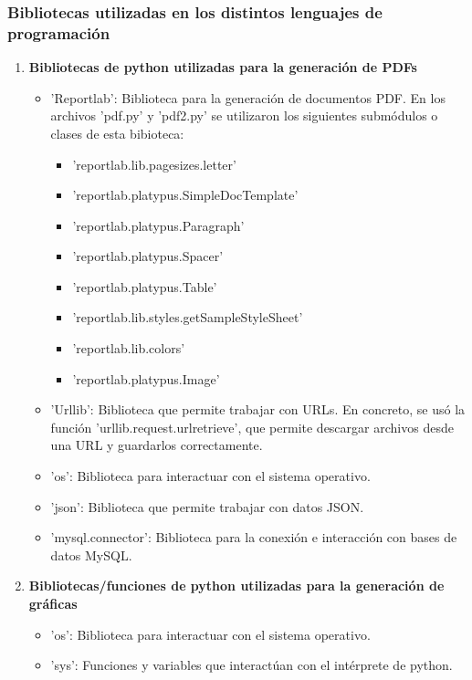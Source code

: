 \subsubsection{Bibliotecas utilizadas en los distintos lenguajes de programación}
\begin{enumerate}
    \item \textbf {Bibliotecas de python utilizadas para la generación de PDFs}
        \begin{itemize}
            \item 'Reportlab': Biblioteca para la generación de documentos PDF. En los archivos 'pdf.py' y 'pdf2.py' se utilizaron los siguientes submódulos o clases de esta bibioteca:
            \begin{itemize}
                \item 'reportlab.lib.pagesizes.letter'
                \item 'reportlab.platypus.SimpleDocTemplate'
                \item 'reportlab.platypus.Paragraph'
                \item 'reportlab.platypus.Spacer'
                \item 'reportlab.platypus.Table'
                \item 'reportlab.lib.styles.getSampleStyleSheet'
                \item 'reportlab.lib.colors'
                \item 'reportlab.platypus.Image'
            \end{itemize}
            \item 'Urllib': Biblioteca que permite trabajar con URLs. En concreto, se usó la función 'urllib.request.urlretrieve', que permite descargar archivos desde una URL y guardarlos correctamente.
            \item 'os': Biblioteca para interactuar con el sistema operativo.
            \item 'json': Biblioteca que permite trabajar con datos JSON.
            \item 'mysql.connector': Biblioteca para la conexión e interacción con bases de datos MySQL.
        \end{itemize}
    \item \textbf {Bibliotecas/funciones de python utilizadas para la generación de gráficas}
            \begin{itemize}
                \item 'os': Biblioteca para interactuar con el sistema operativo.
                \item 'sys': Funciones y variables que interactúan con el intérprete de python.

\end{itemize}
\end{enumerate}
